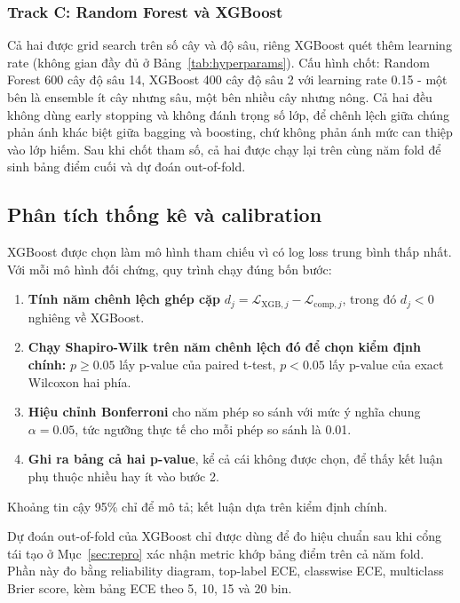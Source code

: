 \documentclass[12pt]{template/ai_conquer2026}
\begin{document}
\subsubsection{Track C: Random Forest và XGBoost}

Cả hai được grid search trên số cây và độ sâu, riêng XGBoost quét thêm learning
rate (không gian đầy đủ ở Bảng~\ref{tab:hyperparams}). Cấu hình chốt: Random Forest
600 cây độ sâu 14, XGBoost 400 cây độ sâu 2 với learning rate 0.15 - một bên là
ensemble ít cây nhưng sâu, một bên nhiều cây nhưng nông. Cả hai đều không dùng
early stopping và không đánh trọng số lớp, để chênh lệch giữa chúng phản ánh khác
biệt giữa bagging và boosting, chứ không phản ánh mức can thiệp vào lớp hiếm. Sau
khi chốt tham số, cả hai được chạy lại trên cùng năm fold để sinh bảng điểm cuối
và dự đoán out-of-fold.

\subsection{Phân tích thống kê và calibration}
\label{sec:stat}

XGBoost được chọn làm mô hình tham chiếu vì có log loss trung bình thấp nhất. Với
mỗi mô hình đối chứng, quy trình chạy đúng bốn bước:

\begin{enumerate}
\item \textbf{Tính năm chênh lệch ghép cặp}
$d_j=\mathcal L_{\mathrm{XGB},j}-\mathcal L_{\mathrm{comp},j}$, trong đó $d_j<0$
nghiêng về XGBoost.
\item \textbf{Chạy Shapiro-Wilk trên năm chênh lệch đó để chọn kiểm định chính:}
$p\geq0.05$ lấy p-value của paired t-test, $p<0.05$ lấy p-value của exact Wilcoxon
hai phía.
\item \textbf{Hiệu chỉnh Bonferroni} cho năm phép so sánh với mức ý nghĩa chung
$\alpha=0.05$, tức ngưỡng thực tế cho mỗi phép so sánh là 0.01.
\item \textbf{Ghi ra bảng cả hai p-value}, kể cả cái không được chọn, để thấy kết
luận phụ thuộc nhiều hay ít vào bước 2.
\end{enumerate}

\noindent Khoảng tin cậy 95\% chỉ để mô tả; kết luận dựa trên kiểm định chính.

Dự đoán out-of-fold của XGBoost chỉ được dùng để đo hiệu chuẩn sau khi cổng tái tạo
ở Mục~\ref{sec:repro} xác nhận metric khớp bảng điểm trên cả năm fold. Phần này đo
bằng reliability diagram, top-label ECE, classwise ECE, multiclass Brier score, kèm
bảng ECE theo 5, 10, 15 và 20 bin.
\end{document}
